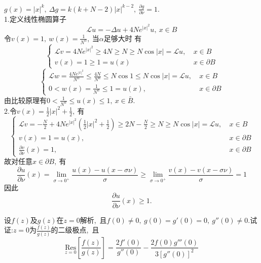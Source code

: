 	\begin{solution}
		$g(x)=|x|^k,\ \Delta g=k(k+N-2)|x|^{k-2},\ \frac{\partial g}{\partial \nu}=1.$\\
		1.定义线性椭圆算子$$\mathcal{L}u=-\Delta u+4Ne^{|x|^2}u,\ x\in B$$
		令$v(x)=1,\ w(x)=\frac{1}{N^\alpha},\ $当$\alpha$足够大时
		有$$\begin{cases}
			\mathcal{L}v=4Ne^{|x|^2}\geqslant 4N\geqslant N\geqslant N\cos|x|=\mathcal{L}u,\ &x\in B\\
			v(x)=1\geqslant 1=u(x)&x\in \partial B
		\end{cases}$$
		$$\begin{cases}
			\mathcal{L}w=\frac{4Ne^{|x|^2}}{N^\alpha}\leqslant \frac{4N}{N^\alpha}\leqslant N\cos 1\leqslant N\cos|x|=\mathcal{L}u,\ &x\in B\\
			0<w(x)=\frac{1}{N^\alpha}\leqslant 1=u(x),\ &x\in \partial B
		\end{cases}$$
		由比较原理有$0<\frac{1}{N^\alpha}\leqslant u(x)\leqslant 1,\ x\in\bar{B}.$\\
		2.令$v(x)=\frac{1}{2}|x|^2+\frac{1}{2},\ $有
		$$\begin{cases}
			\mathcal{L}v=-\frac{N}{2}+4Ne^{|x|^2}(\frac{1}{2}|x|^2+\frac{1}{2})\geqslant 2N-\frac{N}{2}\geqslant N\geqslant N\cos|x|=\mathcal{L}u,\ &x\in B\\
			v(x)=1=u(x),\ &x\in \partial B\\
			\frac{\partial v}{\partial \nu}(x)=1,\ &x\in \partial B
		\end{cases}$$
		故对任意$x\in \partial B,\ $有
		$$\frac{\partial u}{\partial \nu}(x)=\lim\limits_{\sigma\rightarrow 0^+}\frac{u(x)-u(x-\sigma \nu)}{\sigma}\geqslant\lim\limits_{\sigma\rightarrow 0^+}\frac{v(x)-v(x-\sigma\nu) }{\sigma}=1$$
		因此
		$$\frac{\partial u}{\partial \nu}(x)\geqslant 1.$$
	\end{solution}
	\newpage
	\begin{problem}
		设$f(z)$及$g(z)$在$z=0$解析,\ 且$f(0)\neq 0,\ g(0)=g'(0)=0,\ g''(0)\neq0.$试证:$z=0$为$\frac{f(z)}{g(z)}$的二级极点,\ 且
		$$\underset{z=0}{\text{Res}}\left[\frac{f(z)}{g(z)}\right]=\frac{2f'(0)}{g''(0)}-\frac{2f(0)g'''(0)}{3\left[g''(0)\right]^2}$$
	\end{problem}
	
